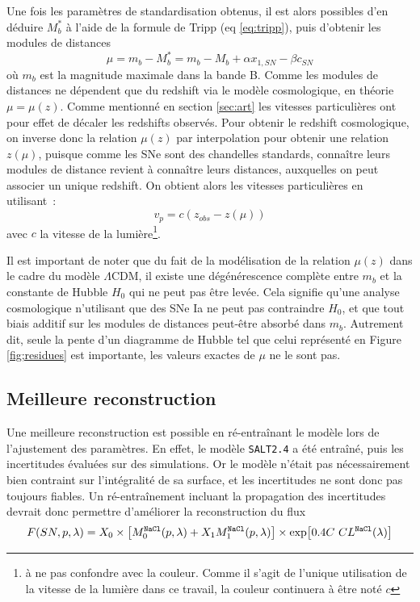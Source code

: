 \documentclass{book}
\def\nacl{\texttt{NaCl}\xspace}
\def\saltd{\texttt{SALT2.4}\xspace}
\begin{document}
Une fois les paramètres de standardisation obtenus, il est alors possibles d'en déduire $M_b^*$ à l'aide de la formule de Tripp (eq \ref{eq:tripp}), puis d'obtenir les modules de distances
\begin{equation}
    \mu = m_b - M_b^* = m_b - M_b + \alpha x_{1, SN} - \beta c_{SN}
\end{equation}
où $m_b$ est la magnitude maximale dans la bande B.
Comme les modules de distances ne dépendent que du redshift via le modèle cosmologique, en théorie $\mu = \mu(z)$. Comme mentionné en section \ref{sec:art} les vitesses particulières ont pour effet de décaler les redshifts observés. Pour obtenir le redshift cosmologique, on inverse donc la relation $\mu(z)$ par interpolation pour obtenir une relation $z(\mu)$, puisque comme les SNe sont des chandelles standards, connaître leurs modules de distance revient à connaître leurs distances, auxquelles on peut associer un unique redshift. On obtient alors les vitesses particulières en utilisant~:
\begin{equation}
    v_p = c (z_{obs} - z(\mu))
\end{equation}
avec $c$ la vitesse de la lumière\footnote{à ne pas confondre avec la couleur. Comme il s'agit de l'unique utilisation de la vitesse de la lumière dans ce travail, la couleur continuera à être noté $c$}.

Il est important de noter que du fait de la modélisation de la relation $\mu(z)$ dans le cadre du modèle $\Lambda$CDM, il existe une dégénérescence complète entre $m_b$ et la constante de Hubble $H_0$ qui ne peut pas être levée. Cela signifie qu'une analyse cosmologique n'utilisant que des SNe Ia ne peut pas contraindre $H_0$, et que tout biais additif sur les modules de distances peut-être absorbé dans $m_b$. Autrement dit, seule la pente d'un diagramme de Hubble tel que celui représenté en Figure \ref{fig;residues} est importante, les valeurs exactes de $\mu$ ne le sont pas.

\subsection{Meilleure reconstruction}

Une meilleure reconstruction est possible en ré-entraînant le modèle lors de l'ajustement des paramètres. En effet, le modèle \saltd a été entraîné, puis les incertitudes évaluées sur des simulations. Or le modèle n'était pas nécessairement bien contraint sur l'intégralité de sa surface, et les incertitudes ne sont donc pas toujours fiables. Un ré-entraînement incluant la propagation des incertitudes devrait donc permettre d'améliorer la reconstruction du flux
\begin{equation}
    F(SN, p, \lambda) = X_0 \times \qty[M^{\nacl}_0(p, \lambda) + X_1 M^{\nacl}_1(p, \lambda)] \times \exp[0.4 C\  CL^{\nacl}(\lambda)]
\end{equation}
\end{document}
